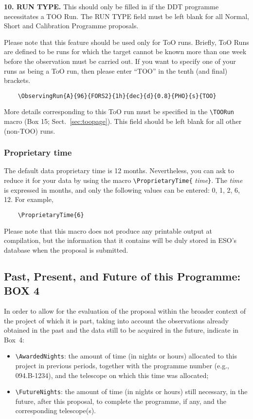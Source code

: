 \documentclass{article}
\begin{document}
\medskip

{\bf 10.  RUN TYPE.}
This should only be filled in if the DDT programme 
necessitates a TOO Run. The RUN TYPE field must be left blank for all
Normal, Short and Calibration Programme proposals.

Please note that this feature should be used only for ToO runs.
Briefly, ToO Runs are defined to be runs for which the target cannot be known more than
one week before the observation must be carried out.
If you want to specify one of your runs
as being a ToO run, then please enter ``TOO'' in the tenth (and final) brackets.

\begin{verbatim}
    \ObservingRun{A}{96}{FORS2}{1h}{dec}{d}{0.8}{PHO}{s}{TOO}
\end{verbatim}

More details corresponding to this ToO run must be specified in the
\verb|\TOORun| macro (Box 15; Sect.~\ref{sec:toopage}).
This field should be left blank for all other (non-TOO) runs.


\subsubsection*{Proprietary time} 
The default data proprietary time is 12 months.  Nevertheless, you can
ask to reduce it for 
your data by using the macro \verb|\ProprietaryTime{|{\it
    time\/}\verb|}|.  The {\it time\/} is expressed in months, and
only the following values can be entered:  0, 1, 2, 6, 12.  For
example, 
\begin{verbatim}
    \ProprietaryTime{6}
\end{verbatim}

Please note that this macro does not produce any printable output at
compilation, but the information that it contains will be duly stored
in ESO's database when the proposal is submitted.

\subsection{Past, Present, and Future of this Programme:  {\bf BOX 4}}

In order to allow for the evaluation of the proposal within the
broader context of the project of which it is part, taking into
account the observations already obtained in the past and the data
still to be acquired in the future, indicate in Box~4:
\begin{itemize}
\item \verb|\AwardedNights|: the amount of time (in nights or hours)
  allocated to this project in previous periods, together with the
  programme number (e.g., 094.B-1234), and the telescope
  on which this time was allocated;
\item \verb|\FutureNights|: the amount of time (in nights or hours)
  still necessary, in the future, after this proposal, to complete the
  programme, if any, and the corresponding telescope(s). 
\end{itemize}
\end{document}
